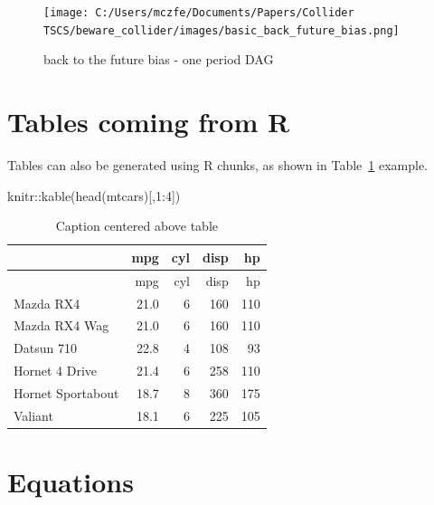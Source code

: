 \documentclass[
  super,
  preprint,
  3p]{elsarticle}
\newenvironment{Shaded}{\begin{snugshade}}{\end{snugshade}}
\newcommand{\DecValTok}[1]{\textcolor[rgb]{0.68,0.00,0.00}{#1}}
\newcommand{\FunctionTok}[1]{\textcolor[rgb]{0.28,0.35,0.67}{#1}}
\newcommand{\NormalTok}[1]{\textcolor[rgb]{0.00,0.23,0.31}{#1}}
\newcommand{\SpecialCharTok}[1]{\textcolor[rgb]{0.37,0.37,0.37}{#1}}
\begin{document}
\begin{figure}

{\centering \texttt{[image: C:/Users/mczfe/Documents/Papers/Collider TSCS/beware\_collider/images/basic\_back\_future\_bias.png]}

}

\caption{back to the future bias - one period DAG}

\end{figure}

\hypertarget{tables-coming-from-r}{%
\section{Tables coming from R}\label{tables-coming-from-r}}

Tables can also be generated using R chunks, as shown in
Table~\ref{tbl-simple} example.

\begin{Shaded}
\begin{Highlighting}[]
\NormalTok{knitr}\SpecialCharTok{::}\FunctionTok{kable}\NormalTok{(}\FunctionTok{head}\NormalTok{(mtcars)[,}\DecValTok{1}\SpecialCharTok{:}\DecValTok{4}\NormalTok{])}
\end{Highlighting}
\end{Shaded}

\hypertarget{tbl-simple}{}
\begin{longtable}[]{@{}lrrrr@{}}
\caption{\label{tbl-simple}Caption centered above table}\tabularnewline
\toprule\noalign{}
& mpg & cyl & disp & hp \\
\midrule\noalign{}
\endfirsthead
\toprule\noalign{}
& mpg & cyl & disp & hp \\
\midrule\noalign{}
\endhead
\bottomrule\noalign{}
\endlastfoot
Mazda RX4 & 21.0 & 6 & 160 & 110 \\
Mazda RX4 Wag & 21.0 & 6 & 160 & 110 \\
Datsun 710 & 22.8 & 4 & 108 & 93 \\
Hornet 4 Drive & 21.4 & 6 & 258 & 110 \\
Hornet Sportabout & 18.7 & 8 & 360 & 175 \\
Valiant & 18.1 & 6 & 225 & 105 \\
\end{longtable}

\hypertarget{equations}{%
\section{Equations}\label{equations}}
\end{document}
